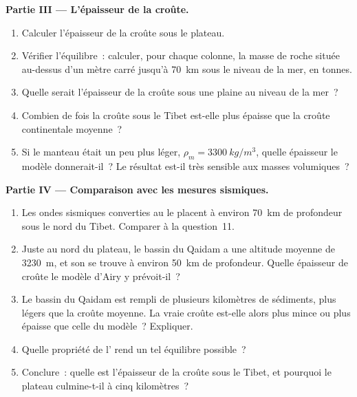 \begin{problem}
\medskip
\noindent\textbf{Partie III --- L'épaisseur de la croûte.}
\begin{enumerate}[resume]
  \item Calculer l'épaisseur de la croûte sous le plateau.
  \item Vérifier l'équilibre~: calculer, pour chaque colonne, la masse de
        roche située au-dessus d'un mètre carré jusqu'à \qty{70}{km} sous le
        niveau de la mer, en tonnes.
  \item Quelle serait l'épaisseur de la croûte sous une plaine au niveau de
        la mer~?
  \item Combien de fois la croûte sous le Tibet est-elle plus épaisse que
        la croûte continentale moyenne~?
  \item Si le manteau était un peu plus léger,
        $\rho_m = \qty{3300}{kg/m^3}$, quelle épaisseur le modèle donnerait-il~? Le
        résultat est-il très sensible aux masses volumiques~?
\end{enumerate}

\medskip
\noindent\textbf{Partie IV --- Comparaison avec les mesures sismiques.}
\begin{enumerate}[resume]
  \item Les ondes sismiques converties au  le placent à environ
        \qty{70}{km} de profondeur sous le nord du Tibet. Comparer à la
        question~11.
  \item Juste au nord du plateau, le bassin du Qaidam a une altitude
        moyenne de \qty{3230}{m}, et son  se trouve à environ
        \qty{50}{km} de profondeur. Quelle épaisseur de croûte le modèle
        d'Airy y prévoit-il~?
  \item Le bassin du Qaidam est rempli de plusieurs kilomètres de
        sédiments, plus légers que la croûte moyenne. La vraie croûte
        est-elle alors plus mince ou plus épaisse que celle du modèle~?
        Expliquer.
  \item Quelle propriété de l' rend un tel équilibre possible~?
  \item Conclure~: quelle est l'épaisseur de la croûte sous le Tibet, et
        pourquoi le plateau culmine-t-il à cinq kilomètres~?
\end{enumerate}
\end{problem}
